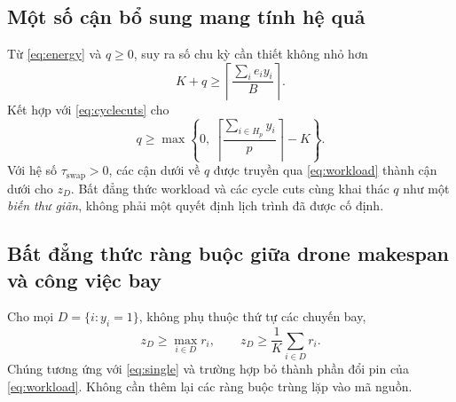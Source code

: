 \documentclass[11pt,a4paper]{article}
\theoremstyle{definition}
\theoremstyle{plain}
\theoremstyle{remark}
\newcommand{\sw}{\tau_{\mathrm{swap}}}
\begin{document}
\subsection{Một số cận bổ sung mang tính hệ quả}
Từ \eqref{eq:energy} và $q\ge0$, suy ra số chu kỳ cần thiết không nhỏ hơn
\begin{equation}
K+q\ge\left\lceil\frac{\sum_i e_i y_i}{B}\right\rceil.
\end{equation}
Kết hợp với \eqref{eq:cyclecuts} cho
\begin{equation}
q\ge\max\left\{0,\ \left\lceil\frac{\sum_{i\in H_p}y_i}{p}\right\rceil-K\right\}.
\end{equation}
Với hệ số $\sw>0$, các cận dưới về $q$ được truyền qua \eqref{eq:workload} thành cận dưới cho $z_D$. Bất đẳng thức workload và các cycle cuts cùng khai thác $q$ như một \emph{biến thư giãn}, không phải một quyết định lịch trình đã được cố định.

\subsection{Bất đẳng thức ràng buộc giữa drone makespan và công việc bay}
Cho mọi $D=\{i:y_i=1\}$, không phụ thuộc thứ tự các chuyến bay,
\begin{equation}\label{eq:lb-work-plain}
z_D\ge\max_{i\in D}r_i,\qquad
z_D\ge\frac1K\sum_{i\in D}r_i.
\end{equation}
Chúng tương ứng với \eqref{eq:single} và trường hợp bỏ thành phần đổi pin của \eqref{eq:workload}. Không cần thêm lại các ràng buộc trùng lặp vào mã nguồn.
\end{document}
